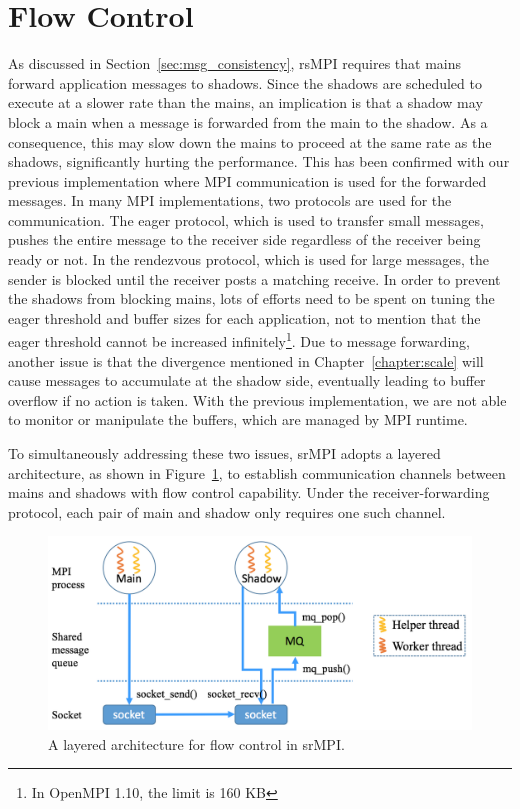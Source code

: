 \section{Flow Control}
As discussed in Section~\ref{sec:msg_consistency}, rsMPI requires that mains forward application messages to shadows. Since the shadows are scheduled to execute at a slower rate than the mains, an implication is that a shadow may block a main when a message is forwarded from the main to the shadow. As a consequence, this may slow down the mains to proceed at the same rate as the shadows, significantly hurting the performance. 
This has been confirmed with our previous implementation where MPI communication is used for the forwarded messages. In many MPI implementations, two protocols are used for the communication. The eager protocol, which is used to transfer small messages, pushes the entire message to the receiver side regardless of the receiver being ready or not. In the rendezvous protocol, which is used for large messages, the sender is blocked until the receiver posts a matching receive. In order to prevent the shadows from blocking mains, lots of efforts need to be spent on tuning the eager threshold and buffer sizes for each application, not to mention that the eager threshold cannot be increased infinitely\footnote{In OpenMPI 1.10, the limit is 160 KB}. 
Due to message forwarding, another issue is that the divergence mentioned in Chapter~\ref{chapter:scale} will cause messages to accumulate at the shadow side, eventually leading to buffer overflow if no action is taken. With the previous implementation, we are not able to monitor or manipulate the buffers, which are managed by MPI runtime.

To simultaneously addressing these two issues, srMPI adopts a layered architecture, as shown in Figure~\ref{fig:flow_control}, to establish communication channels between mains and shadows with flow control capability. Under the receiver-forwarding protocol, each pair of main and shadow only requires one such channel. 

\begin{figure}[!t]
  \begin{center}
      \includegraphics[width=\columnwidth]{Figures/flow_control}
  \end{center}
  \caption{A layered architecture for flow control in srMPI.}
  \label{fig:flow_control}
\end{figure}

